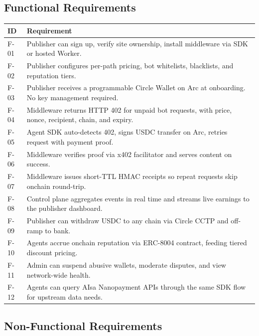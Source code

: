 \documentclass[11pt,a4paper]{article}
\begin{document}
\subsection{Functional Requirements}

\begin{table}[H]
\centering
\footnotesize
\begin{tabularx}{\textwidth}{@{} l X @{}}
\toprule
\textbf{ID} & \textbf{Requirement} \\
\midrule
F-01 & Publisher can sign up, verify site ownership, install middleware via SDK or hosted Worker. \\
F-02 & Publisher configures per-path pricing, bot whitelists, blacklists, and reputation tiers. \\
F-03 & Publisher receives a programmable Circle Wallet on Arc at onboarding. No key management required. \\
F-04 & Middleware returns HTTP 402 for unpaid bot requests, with price, nonce, recipient, chain, and expiry. \\
F-05 & Agent SDK auto-detects 402, signs USDC transfer on Arc, retries request with payment proof. \\
F-06 & Middleware verifies proof via x402 facilitator and serves content on success. \\
F-07 & Middleware issues short-TTL HMAC receipts so repeat requests skip onchain round-trip. \\
F-08 & Control plane aggregates events in real time and streams live earnings to the publisher dashboard. \\
F-09 & Publisher can withdraw USDC to any chain via Circle CCTP and off-ramp to bank. \\
F-10 & Agents accrue onchain reputation via ERC-8004 contract, feeding tiered discount pricing. \\
F-11 & Admin can suspend abusive wallets, moderate disputes, and view network-wide health. \\
F-12 & Agents can query AIsa Nanopayment APIs through the same SDK flow for upstream data needs. \\
\bottomrule
\end{tabularx}
\end{table}

\subsection{Non-Functional Requirements}
\end{document}
